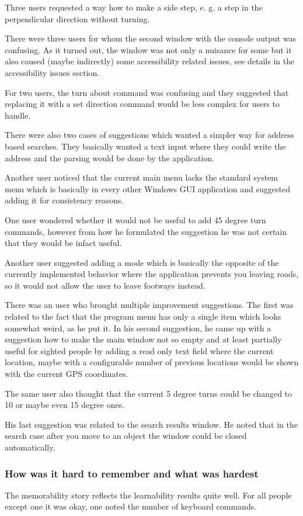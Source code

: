 \documentclass[nolof,digital]{fithesis3}
\begin{document}
Three users requested a way how to make a side step, e. g. a step in the perpendicular direction without turning.

There were three users for whom the second window with the console output was confusing. As it turned out, the window was not only a nuisance for some but it also caused (maybe indirectly) some accessibility related issues, see details in the accessibility issues section.

For two users, the turn about command was confusing and they suggested that replacing it with a set direction command would be less complex for users to handle.

There were also two cases of suggestions which wanted a simpler way for address based searches. They basically wanted a text input where they could write the address and the parsing would be done by the application.

Another user noticed that the current main menu lacks the standard system menu which is basically in every other Windows GUI application and suggested adding it for consistency reasons.

One user wondered whether it would not be useful to add 45 degree turn commands, however from how he formulated the suggestion he was not certain that they would be infact useful.

Another user suggested adding a mode which is basically the opposite of the currently implemented behavior where the application prevents you leaving roads, so it would not allow the user to leave footways instead.

There was an user who brought multiple improvement suggestions. The first was related to the fact that the program menu has only a single item which looks somewhat weird, as he put it. In his second suggestion, he came up with a suggestion how to make the main window not so empty and at least partially useful for sighted people by adding a read only text field where the current location, maybe with a configurable number of previous locations would be shown with the current GPS coordinates.

The same user also thought that the current 5 degree turns could be changed to 10 or maybe even 15 degree ones.

His last suggestion was related to the search results window. He noted that in the search case after you move to an object the window could be closed automatically.
\subsubsection{How was it hard to remember and what was hardest}
The memorability story reflects the learnability results quite well. For all people except one it was okay, one noted the number of keyboard commands.
\end{document}
